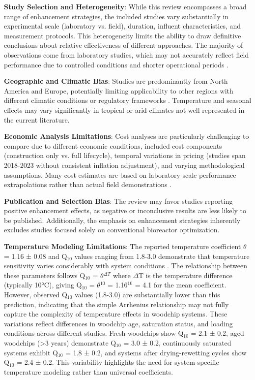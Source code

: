\documentclass[12pt,a4paper]{article}
\begin{document}
\textbf{Study Selection and Heterogeneity}: While this review encompasses a broad range of enhancement strategies, the included studies vary substantially in experimental scale (laboratory vs. field), duration, influent characteristics, and measurement protocols. This heterogeneity limits the ability to draw definitive conclusions about relative effectiveness of different approaches. The majority of observations come from laboratory studies, which may not accurately reflect field performance due to controlled conditions and shorter operational periods \citep{RN312}.

\textbf{Geographic and Climatic Bias}: Studies are predominantly from North America and Europe, potentially limiting applicability to other regions with different climatic conditions or regulatory frameworks \citep{RN1023, RN258}. Temperature and seasonal effects may vary significantly in tropical or arid climates not well-represented in the current literature.

\textbf{Economic Analysis Limitations}: Cost analyses are particularly challenging to compare due to different economic conditions, included cost components (construction only vs. full lifecycle), temporal variations in pricing (studies span 2018-2023 without consistent inflation adjustment), and varying methodological assumptions. Many cost estimates are based on laboratory-scale performance extrapolations rather than actual field demonstrations \citep{RN289}.

\textbf{Publication and Selection Bias}: The review may favor studies reporting positive enhancement effects, as negative or inconclusive results are less likely to be published. Additionally, the emphasis on enhancement strategies inherently excludes studies focused solely on conventional bioreactor optimization.

\textbf{Temperature Modeling Limitations}: The reported temperature coefficient $\theta$ = 1.16 ± 0.08 and Q$_{10}$ values ranging from 1.8-3.0 demonstrate that temperature sensitivity varies considerably with system conditions \citep{RN242, RN228}. The relationship between these parameters follows Q$_{10}$ = $\theta$$^{\Delta T}$ where $\Delta$T is the temperature difference (typically 10°C), giving Q$_{10}$ = $\theta$$^{10}$ = 1.16$^{10}$ = 4.1 for the mean coefficient. However, observed Q$_{10}$ values (1.8-3.0) are substantially lower than this prediction, indicating that the simple Arrhenius relationship may not fully capture the complexity of temperature effects in woodchip systems. These variations reflect differences in woodchip age, saturation status, and loading conditions across different studies. Fresh woodchips show Q$_{10}$ = 2.1 ± 0.2, aged woodchips (>3 years) demonstrate Q$_{10}$ = 3.0 ± 0.2, continuously saturated systems exhibit Q$_{10}$ = 1.8 ± 0.2, and systems after drying-rewetting cycles show Q$_{10}$ = 2.4 ± 0.2. This variability highlights the need for system-specific temperature modeling rather than universal coefficients.
\end{document}
